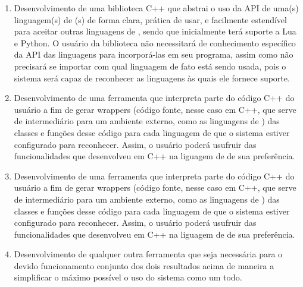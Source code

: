 \begin{enumerate}
  \item Desenvolvimento de uma biblioteca C++ que abstrai o uso da API de uma(s)
        linguagem(s) de \script(s) de forma clara, prática de usar, e facilmente
        estendível para aceitar outras linguagens de \script, sendo que
        inicialmente terá suporte a Lua e Python. O usuário da biblioteca não
        necessitará de conhecimento específico da API das linguagens para
        incorporá-las em seu programa, assim como não precisará se importar com
        qual linguagem de fato está sendo usada, pois o sistema será capaz de
        reconhecer as linguagens às quais ele fornece suporte.
  \item Desenvolvimento de uma ferramenta que interpreta parte do código C++ do
        usuário a fim de gerar wrappers (código fonte, nesse caso em C++, que
        serve de intermediário para um ambiente externo, como as linguagens de
        \script) das classes e funções desse código para cada linguagem de \script
        que o sistema estiver configurado para reconhecer. Assim, o usuário
        poderá usufruir das funcionalidades que desenvolveu em C++ na liguagem
        de \script de sua preferência.
  \item Desenvolvimento de uma ferramenta que interpreta parte do código C++ do
        usuário a fim de gerar wrappers (código fonte, nesse caso em C++, que
        serve de intermediário para um ambiente externo, como as linguagens de
        \script) das classes e funções desse código para cada linguagem de \script
        que o sistema estiver configurado para reconhecer. Assim, o usuário
        poderá usufruir das funcionalidades que desenvolveu em C++ na liguagem
        de \script de sua preferência.
  \item Desenvolvimento de qualquer outra ferramenta que seja necessária para o
        devido funcionamento conjunto dos dois resultados acima de maneira a
        simplificar o máximo possível o uso do sistema como um todo.
\end{enumerate}






